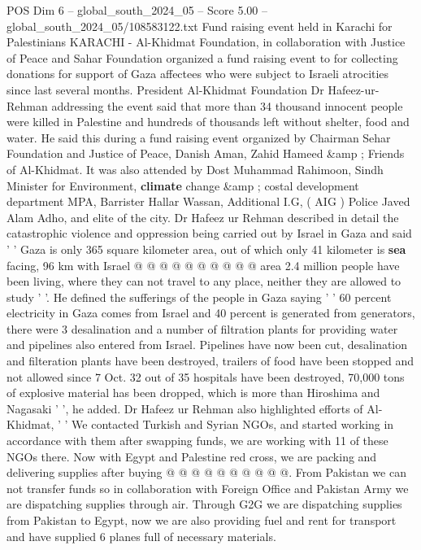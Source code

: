 \begin{textsample}{POS Dim 6 – global\_south\_2024\_05 – Score 5.00 – global\_south\_2024\_05/108583122.txt}  \label{ex:f6_pos_159}
Fund raising event held in Karachi for Palestinians KARACHI - Al-Khidmat Foundation, in collaboration with Justice of Peace and Sahar Foundation organized a fund raising event to for collecting donations for support of Gaza affectees who were subject to Israeli atrocities since last several months.
President Al-Khidmat Foundation Dr Hafeez-ur-Rehman addressing the event said that more than 34 thousand innocent people were killed in Palestine and hundreds of thousands left without shelter, food and water.
He said this during a fund raising event organized by Chairman Sehar Foundation and Justice of Peace, Danish Aman, Zahid Hameed \&amp ; Friends of Al-Khidmat.
It was also attended by Dost Muhammad Rahimoon, Sindh Minister for Environment, \textbf{climate} change \&amp ; costal development department MPA, Barrister Hallar Wassan, Additional I.G, ( AIG ) Police Javed Alam Adho, and elite of the city.
Dr Hafeez ur Rehman described in detail the catastrophic violence and oppression being carried out by Israel in Gaza and said ' ' Gaza is only 365 square kilometer area, out of which only 41 kilometer is \textbf{sea} facing, 96 km with Israel @ @ @ @ @ @ @ @ @ @ area 2.4 million people have been living, where they can not travel to any place, neither they are allowed to study ' '.
He defined the sufferings of the people in Gaza saying ' ' 60 percent electricity in Gaza comes from Israel and 40 percent is generated from generators, there were 3 desalination and a number of filtration plants for providing water and pipelines also entered from Israel.
Pipelines have now been cut, desalination and filteration plants have been destroyed, trailers of food have been stopped and not allowed since 7 Oct. 32 out of 35 hospitals have been destroyed, 70,000 tons of explosive material has been dropped, which is more than Hiroshima and Nagasaki ' ', he added.
Dr Hafeez ur Rehman also highlighted efforts of Al-Khidmat, ' ' We contacted Turkish and Syrian NGOs, and started working in accordance with them after swapping funds, we are working with 11 of these NGOs there.
Now with Egypt and Palestine red cross, we are packing and delivering supplies after buying @ @ @ @ @ @ @ @ @ @.
From Pakistan we can not transfer funds so in collaboration with Foreign Office and Pakistan Army we are dispatching supplies through air.
Through G2G we are dispatching supplies from Pakistan to Egypt, now we are also providing fuel and rent for transport and have supplied 6 planes full of necessary materials.

\end{textsample}
